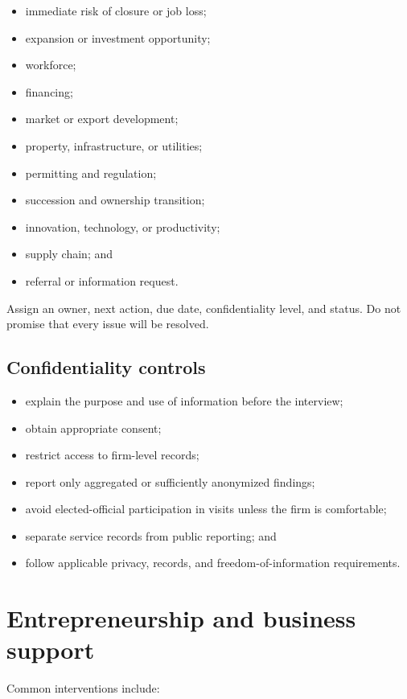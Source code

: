 \documentclass[11pt,letterpaper,oneside,openany]{book}
\begin{document}
\begin{itemize}
\item immediate risk of closure or job loss;
\item expansion or investment opportunity;
\item workforce;
\item financing;
\item market or export development;
\item property, infrastructure, or utilities;
\item permitting and regulation;
\item succession and ownership transition;
\item innovation, technology, or productivity;
\item supply chain; and
\item referral or information request.
\end{itemize}


Assign an owner, next action, due date, confidentiality level, and status. Do not promise that every issue will be resolved.


\subsection[Confidentiality controls]{Confidentiality controls}
\begin{itemize}
\item explain the purpose and use of information before the interview;
\item obtain appropriate consent;
\item restrict access to firm-level records;
\item report only aggregated or sufficiently anonymized findings;
\item avoid elected-official participation in visits unless the firm is comfortable;
\item separate service records from public reporting; and
\item follow applicable privacy, records, and freedom-of-information requirements.
\end{itemize}


\section[Entrepreneurship and business support]{Entrepreneurship and business support}
Common interventions include:
\end{document}

